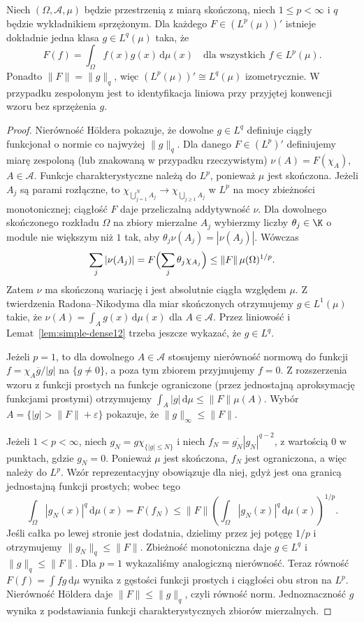 \begin{twierdzenie}
\label{thm:lp-dual12}
Niech $(\Omega,\mathcal A,\mu)$ będzie przestrzenią z miarą
skończoną, niech $1\le p<\infty$ i $q$ będzie wykładnikiem
sprzężonym. Dla każdego $F\in(L^p(\mu))'$ istnieje dokładnie
jedna klasa $g\in L^q(\mu)$ taka, że
\[
 F(f)=\int_\Omega f(x)g(x)\,\mathrm d\mu(x)
 \quad\text{dla wszystkich }f\in L^p(\mu).
\]
Ponadto $\|F\|=\|g\|_q$, więc
$(L^p(\mu))'\cong L^q(\mu)$ izometrycznie. W przypadku
zespolonym jest to identyfikacja liniowa przy przyjętej konwencji
wzoru bez sprzężenia $g$.
\end{twierdzenie}
\begin{proof}
Nierówność H\"oldera pokazuje, że dowolne $g\in L^q$
definiuje ciągły funkcjonał o normie co najwyżej $\|g\|_q$.
Dla danego $F\in(L^p)'$ definiujemy miarę zespoloną
(lub znakowaną w przypadku rzeczywistym)
$\nu(A)=F(\chi_A)$, $A\in\mathcal A$.
Funkcje charakterystyczne należą do $L^p$, ponieważ $\mu$ jest skończona.
Jeżeli $A_j$ są parami rozłączne, to
$\chi_{\bigcup_{j=1}^N A_j}\to\chi_{\bigcup_{j\ge1}A_j}$
w $L^p$ na mocy zbieżności monotonicznej; ciągłość $F$
daje przeliczalną addytywność $\nu$.
Dla dowolnego skończonego rozkładu $\Omega$ na zbiory
mierzalne $A_j$ wybierzmy liczby $\theta_j\in\K$ o module
nie większym niż $1$ tak, aby
$\theta_j\nu(A_j)=|\nu(A_j)|$. Wówczas
\[
 \sum_j|\nu(A_j)|
 =F\Bigl(\sum_j\theta_j\chi_{A_j}\Bigr)
 \le\|F\|\,\mu(\Omega)^{1/p}.
\]
Zatem $\nu$ ma skończoną wariację i jest absolutnie ciągła
względem $\mu$. Z twierdzenia Radona--Nikodyma dla miar
skończonych otrzymujemy $g\in L^1(\mu)$ takie, że
$\nu(A)=\int_Ag(x)\,\mathrm d\mu(x)$ dla $A\in\mathcal A$.
Przez liniowość i Lemat~\ref{lem:simple-dense12} trzeba jeszcze
wykazać, że $g\in L^q$.

Jeżeli $p=1$, to dla dowolnego $A\in\mathcal A$ stosujemy
nierówność normową do funkcji
$f=\chi_A\overline g/|g|$ na $\{g\ne0\}$,
a poza tym zbiorem przyjmujemy $f=0$. Z rozszerzenia wzoru
z funkcji prostych na funkcje ograniczone (przez jednostajną
aproksymację funkcjami prostymi) otrzymujemy
$\int_A|g|\,\mathrm d\mu\le\|F\|\mu(A)$.
Wybór $A=\{|g|>\|F\|+\varepsilon\}$ pokazuje,
że $\|g\|_\infty\le\|F\|$.

Jeżeli $1<p<\infty$, niech
$g_N=g\chi_{\{|g|\le N\}}$ i niech
$f_N=\overline{g_N}|g_N|^{q-2}$, z wartością $0$ w
punktach, gdzie $g_N=0$. Ponieważ $\mu$ jest skończona,
$f_N$ jest ograniczona, a więc należy do $L^p$.
Wzór reprezentacyjny obowiązuje dla niej, gdyż
jest ona granicą jednostajną funkcji prostych; wobec tego
\[
 \int_\Omega|g_N(x)|^q\,\mathrm d\mu(x)
 =F(f_N)\le\|F\|\left(\int_\Omega|g_N(x)|^q\,\mathrm d\mu(x)\right)^{1/p}.
\]
Jeśli całka po lewej stronie jest dodatnia, dzielimy przez
jej potęgę $1/p$ i otrzymujemy $\|g_N\|_q\le\|F\|$.
Zbieżność monotoniczna daje $g\in L^q$ i $\|g\|_q\le\|F\|$.
Dla $p=1$ wykazaliśmy analogiczną nierówność.
Teraz równość $F(f)=\int fg\,\mathrm d\mu$ wynika z gęstości
funkcji prostych i ciągłości obu stron na $L^p$.
Nierówność H\"oldera daje $\|F\|\le\|g\|_q$, czyli
równość norm. Jednoznaczność $g$ wynika z podstawiania
funkcji charakterystycznych zbiorów mierzalnych.
\end{proof}

